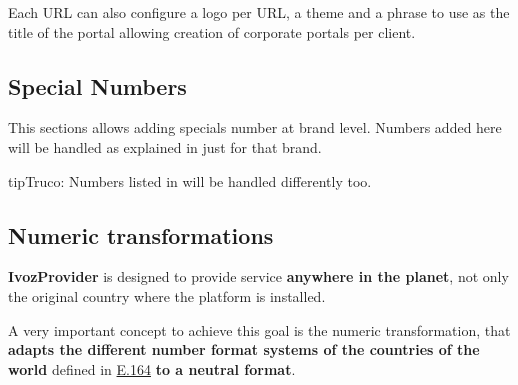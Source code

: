 \documentclass[letterpaper,10pt,spanish]{sphinxmanual}
\begin{document}
Each URL can also configure a logo per URL, a theme and a phrase to use as
the title of the portal allowing creation of corporate portals per client.


\subsection{Special Numbers}
\label{administration_portal/brand/settings/special_numbers:special-numbers}\label{administration_portal/brand/settings/special_numbers::doc}\label{administration_portal/brand/settings/special_numbers:id1}
This sections allows adding specials number at brand level. Numbers added here will be handled as explained in
{\hyperref[administration_portal/platform/global_special_numbers:global\string-special\string-numbers]{}} just for that brand.

\begin{notice}{tip}{Truco:}
Numbers listed in {\hyperref[administration_portal/platform/global_special_numbers:global\string-special\string-numbers]{}} will be handled differently too.
\end{notice}
\label{administration_portal/brand/settings/numeric_transformations:transformations}\label{administration_portal/brand/settings/numeric_transformations:numeric-transformations}

\subsection{Numeric transformations}
\label{administration_portal/brand/settings/numeric_transformations:transformaciones-numericas}\label{administration_portal/brand/settings/numeric_transformations:id1}\label{administration_portal/brand/settings/numeric_transformations::doc}\label{administration_portal/brand/settings/numeric_transformations:transformations}\label{administration_portal/brand/settings/numeric_transformations:numeric-transformations}
\textbf{IvozProvider} is designed to provide service \textbf{anywhere in the planet}, not
only the original country where the platform is installed.

A very important concept to achieve this goal is the numeric transformation,
that \textbf{adapts the different number format systems of the countries of the world}
defined in \href{https://www.itu.int/rec/T-REC-E.164/es}{E.164} \textbf{to a neutral format}.
\end{document}
